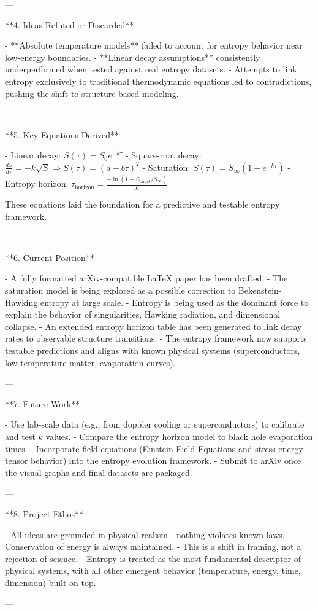 ---

**4. Ideas Refuted or Discarded**

- **Absolute temperature models** failed to account for entropy behavior near low-energy boundaries.
- **Linear decay assumptions** consistently underperformed when tested against real entropy datasets.
- Attempts to link entropy exclusively to traditional thermodynamic equations led to contradictions, pushing the shift to structure-based modeling.

---

**5. Key Equations Derived**

- Linear decay: \( S(\tau) = S_0 e^{-k\tau} \)
- Square-root decay: \( \frac{dS}{d\tau} = -k \sqrt{S} \Rightarrow S(\tau) = (a - b\tau)^2 \)
- Saturation: \( S(\tau) = S_\infty (1 - e^{-k\tau}) \)
- Entropy horizon: \( \tau_{\text{horizon}} = \frac{-\ln(1 - S_{\text{target}} / S_\infty)}{k} \)

These equations laid the foundation for a predictive and testable entropy framework.

---

**6. Current Position**

- A fully formatted arXiv-compatible LaTeX paper has been drafted.
- The saturation model is being explored as a possible correction to Bekenstein-Hawking entropy at large scale.
- Entropy is being used as the dominant force to explain the behavior of singularities, Hawking radiation, and dimensional collapse.
- An extended entropy horizon table has been generated to link decay rates to observable structure transitions.
- The entropy framework now supports testable predictions and aligns with known physical systems (superconductors, low-temperature matter, evaporation curves).

---

**7. Future Work**

- Use lab-scale data (e.g., from doppler cooling or superconductors) to calibrate and test \( k \) values.
- Compare the entropy horizon model to black hole evaporation times.
- Incorporate field equations (Einstein Field Equations and stress-energy tensor behavior) into the entropy evolution framework.
- Submit to arXiv once the visual graphs and final datasets are packaged.

---

**8. Project Ethos**

- All ideas are grounded in physical realism—nothing violates known laws.
- Conservation of energy is always maintained.
- This is a shift in framing, not a rejection of science.
- Entropy is treated as the most fundamental descriptor of physical systems, with all other emergent behavior (temperature, energy, time, dimension) built on top.

---